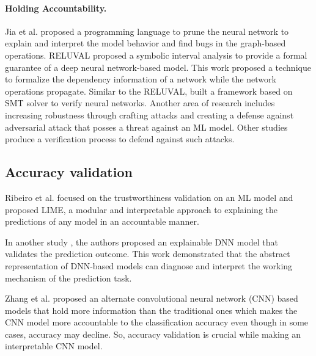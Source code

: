 \paragraph{Holding Accountability.}
Jia et al. \cite{jia2019taso} proposed a programming language to prune the neural network to explain and interpret the model behavior and find bugs in the graph-based operations. RELUVAL \cite{wang2018formal} proposed a symbolic interval analysis to provide a formal guarantee of a deep neural network-based model. This work proposed a technique to formalize the dependency information of a network while the network operations propagate. 
Similar to the RELUVAL, \cite{katz2017reluplex} built a framework based on SMT solver to verify neural networks. Another area of research includes increasing robustness through crafting attacks and creating a defense against adversarial attack \cite{papernot2016towards}  that posses a threat against an ML model. Other studies  \cite{anderson2019optimization,pan2019static} produce a verification process to defend against such attacks.


\subsection{\textbf{Accuracy validation}}
Ribeiro et al. \cite{ribeiro2016should} focused on the trustworthiness validation on an ML model and proposed LIME, a modular and interpretable approach to explaining the predictions of any model in an accountable manner. 

In another study \cite{du2018towards}, the authors proposed an explainable DNN model that validates the prediction outcome. This work demonstrated that the abstract representation of DNN-based models can diagnose and interpret the working mechanism of the prediction task. 

Zhang et al. \cite{zhang2018interpretable} proposed an alternate convolutional neural network (CNN) based models that hold more information than the traditional ones which makes the CNN model more accountable to the classification accuracy even though in some cases, accuracy may decline. So, accuracy validation is crucial while making an interpretable CNN model.

